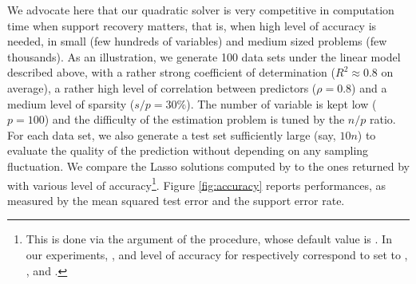 We  advocate here  that our  quadratic solver  is very  competitive in
computation time when support recovery matters, that is, when high level  of accuracy is needed, in small (few
hundreds of variables) and  medium sized problems (few thousands).  As
an  illustration,  we  
generate 100 data sets under the linear model described above, with a rather
strong coefficient of determination ($R^2
\approx 0.8$ on  average), a rather high level  of correlation between
predictors ($\rho=0.8$) and a medium level of sparsity ($s/p = 30\%$).
The number of  variable is kept low ($p=100$) and  the difficulty of the
estimation problem  is tuned  by the  $n/p$  ratio. For  each data  set, we  also
generate a  test set sufficiently  large (say, $10n$) to  evaluate the
quality of the prediction without  depending on any sampling fluctuation.  
We compare the Lasso solutions computed by  to the ones returned by
 with
various   level   of    accuracy\footnote{This   is   done   via   the
    argument of  the   procedure,  whose
  default  value  is .   In  our  experiments,
  ,   and   level of  accuracy for
   respectively correspond to  set to
  , , and .}.  
Figure \ref{fig:accuracy} reports performances, as measured by the mean squared
test error and the support error rate.

